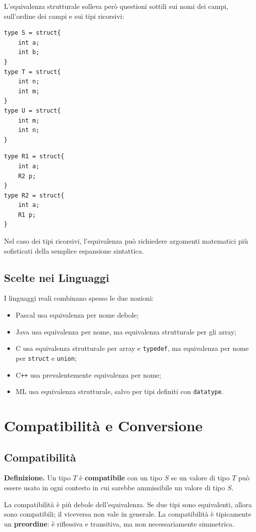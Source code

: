\documentclass{article}
\begin{document}
L'equivalenza strutturale solleva però questioni sottili sui nomi dei campi, sull'ordine dei campi e sui tipi ricorsivi:

\begin{lstlisting}
type S = struct{
    int a;
    int b;
}
type T = struct{
    int n;
    int m;
}
type U = struct{
    int m;
    int n;
}
\end{lstlisting}

\begin{lstlisting}
type R1 = struct{
    int a;
    R2 p;
}
type R2 = struct{
    int a;
    R1 p;
}
\end{lstlisting}

Nel caso dei tipi ricorsivi, l'equivalenza può richiedere argomenti matematici più sofisticati della semplice espansione sintattica.

\subsection{Scelte nei Linguaggi}

I linguaggi reali combinano spesso le due nozioni:
\begin{itemize}
  \item Pascal usa equivalenza per nome debole;
  \item Java usa equivalenza per nome, ma equivalenza strutturale per gli array;
  \item C usa equivalenza strutturale per array e \texttt{typedef}, ma equivalenza per nome per \texttt{struct} e \texttt{union};
  \item C\texttt{++} usa prevalentemente equivalenza per nome;
  \item ML usa equivalenza strutturale, salvo per tipi definiti con \texttt{datatype}.
\end{itemize}

\section{Compatibilità e Conversione}

\subsection{Compatibilità}

\textbf{Definizione.} Un tipo $T$ è \textbf{compatibile} con un tipo $S$ se un valore di tipo $T$ può essere usato in ogni contesto in cui sarebbe ammissibile un valore di tipo $S$.

La compatibilità è più debole dell'equivalenza. Se due tipi sono equivalenti, allora sono compatibili; il viceversa non vale in generale. La compatibilità è tipicamente un \textbf{preordine}: è riflessiva e transitiva, ma non necessariamente simmetrica.
\end{document}
